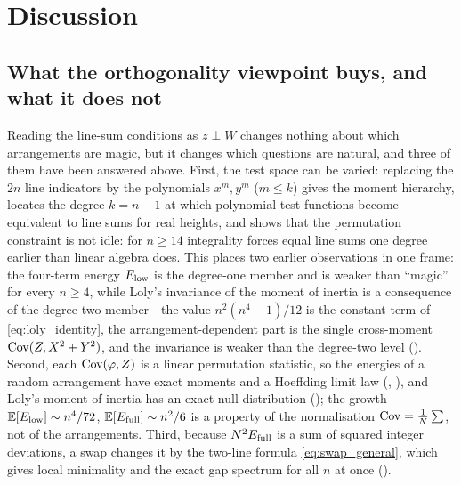 \section{Discussion}
\label{sec:discussion}

\subsection{What the orthogonality viewpoint buys, and what it does not}

Reading the line-sum conditions as $z\perp W$ changes nothing about which arrangements are magic, but it changes which questions are natural, and three of them have been answered above.
First, the test space can be varied: replacing the $2n$ line indicators by the polynomials $x^m,y^m$ ($m\le k$) gives the moment hierarchy,  locates the degree $k=n-1$ at which polynomial test functions become equivalent to line sums for real heights, and  shows that the permutation constraint is not idle: for $n\ge14$ integrality forces equal line sums one degree earlier than linear algebra does.
This places two earlier observations in one frame: the four-term energy $E_{\mathrm{low}}$ is the degree-one member and is weaker than ``magic'' for every $n\ge4$, while Loly's invariance of the moment of inertia \cite{loly2004invariance} is a consequence of the degree-two member---the value $n^2(n^4-1)/12$ is the constant term of \eqref{eq:loly_identity}, the arrangement-dependent part is the single cross-moment $\mathrm{Cov}(Z,X^2+Y^2)$, and the invariance is weaker than the degree-two level ().
Second, each $\mathrm{Cov}(\varphi,Z)$ is a linear permutation statistic, so the energies of a random arrangement have exact moments and a Hoeffding limit law (, ), and Loly's moment of inertia has an exact null distribution (); the growth $\mathbb{E}[E_{\mathrm{low}}]\sim n^4/72$, $\mathbb{E}[E_{\mathrm{full}}]\sim n^2/6$ is a property of the normalisation $\mathrm{Cov}=\frac1N\sum$, not of the arrangements.
Third, because $N^2E_{\mathrm{full}}$ is a sum of squared integer deviations, a swap changes it by the two-line formula \eqref{eq:swap_general}, which gives local minimality and the exact gap spectrum for all $n$ at once ().

